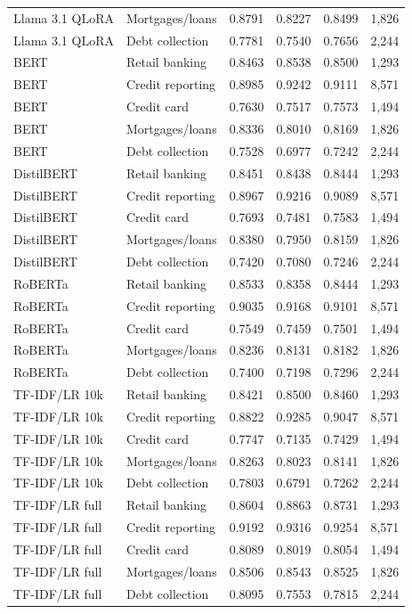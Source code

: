 \documentclass[10pt,a4paper]{article}
\begin{document}
{\begin{longtable}{@{}llrrrr@{}}
Llama 3.1 QLoRA & Mortgages/loans & 0.8791 & 0.8227 & 0.8499 & 1,826 \\
Llama 3.1 QLoRA & Debt collection & 0.7781 & 0.7540 & 0.7656 & 2,244 \\
BERT & Retail banking & 0.8463 & 0.8538 & 0.8500 & 1,293 \\
BERT & Credit reporting & 0.8985 & 0.9242 & 0.9111 & 8,571 \\
BERT & Credit card & 0.7630 & 0.7517 & 0.7573 & 1,494 \\
BERT & Mortgages/loans & 0.8336 & 0.8010 & 0.8169 & 1,826 \\
BERT & Debt collection & 0.7528 & 0.6977 & 0.7242 & 2,244 \\
DistilBERT & Retail banking & 0.8451 & 0.8438 & 0.8444 & 1,293 \\
DistilBERT & Credit reporting & 0.8967 & 0.9216 & 0.9089 & 8,571 \\
DistilBERT & Credit card & 0.7693 & 0.7481 & 0.7583 & 1,494 \\
DistilBERT & Mortgages/loans & 0.8380 & 0.7950 & 0.8159 & 1,826 \\
DistilBERT & Debt collection & 0.7420 & 0.7080 & 0.7246 & 2,244 \\
RoBERTa & Retail banking & 0.8533 & 0.8358 & 0.8444 & 1,293 \\
RoBERTa & Credit reporting & 0.9035 & 0.9168 & 0.9101 & 8,571 \\
RoBERTa & Credit card & 0.7549 & 0.7459 & 0.7501 & 1,494 \\
RoBERTa & Mortgages/loans & 0.8236 & 0.8131 & 0.8182 & 1,826 \\
RoBERTa & Debt collection & 0.7400 & 0.7198 & 0.7296 & 2,244 \\
TF-IDF/LR 10k & Retail banking & 0.8421 & 0.8500 & 0.8460 & 1,293 \\
TF-IDF/LR 10k & Credit reporting & 0.8822 & 0.9285 & 0.9047 & 8,571 \\
TF-IDF/LR 10k & Credit card & 0.7747 & 0.7135 & 0.7429 & 1,494 \\
TF-IDF/LR 10k & Mortgages/loans & 0.8263 & 0.8023 & 0.8141 & 1,826 \\
TF-IDF/LR 10k & Debt collection & 0.7803 & 0.6791 & 0.7262 & 2,244 \\
TF-IDF/LR full & Retail banking & 0.8604 & 0.8863 & 0.8731 & 1,293 \\
TF-IDF/LR full & Credit reporting & 0.9192 & 0.9316 & 0.9254 & 8,571 \\
TF-IDF/LR full & Credit card & 0.8089 & 0.8019 & 0.8054 & 1,494 \\
TF-IDF/LR full & Mortgages/loans & 0.8506 & 0.8543 & 0.8525 & 1,826 \\
TF-IDF/LR full & Debt collection & 0.8095 & 0.7553 & 0.7815 & 2,244 \\
\end{longtable}
}
\end{document}
